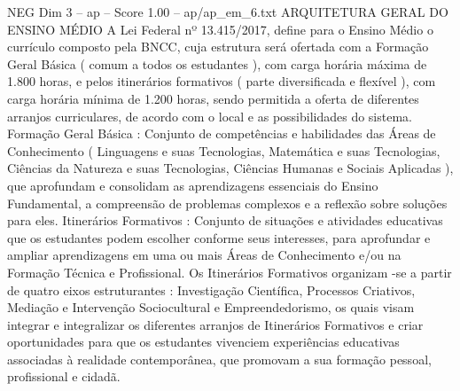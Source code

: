 \begin{textsample}{NEG Dim 3 – ap – Score 1.00 – ap/ap\_em\_6.txt}  \label{ex:f3_neg_109}
ARQUITETURA GERAL DO ENSINO MÉDIO A Lei Federal nº 13.415/2017, define para o Ensino Médio o currículo composto pela BNCC, cuja estrutura será ofertada com a Formação Geral Básica ( comum a todos os estudantes ), com carga horária máxima de 1.800 horas, e pelos itinerários formativos ( parte diversificada e flexível ), com carga horária mínima de 1.200 horas, sendo permitida a oferta de diferentes arranjos curriculares, de acordo com o local e as possibilidades do sistema.
Formação Geral Básica : Conjunto de competências e habilidades das Áreas de Conhecimento ( Linguagens e suas Tecnologias, Matemática e suas Tecnologias, Ciências da Natureza e suas Tecnologias, Ciências Humanas e Sociais Aplicadas ), que aprofundam e consolidam as aprendizagens essenciais do Ensino Fundamental, a compreensão de problemas complexos e a reflexão sobre soluções para eles.
Itinerários Formativos : Conjunto de situações e atividades educativas que os estudantes podem escolher conforme seus interesses, para aprofundar e ampliar aprendizagens em uma ou mais Áreas de Conhecimento e/ou na Formação Técnica e Profissional.
Os Itinerários Formativos organizam -se a partir de quatro eixos estruturantes : Investigação Científica, Processos Criativos, Mediação e Intervenção Sociocultural e Empreendedorismo, os quais visam integrar e integralizar os diferentes arranjos de Itinerários Formativos e criar oportunidades para que os estudantes vivenciem experiências educativas associadas à realidade contemporânea, que promovam a sua formação pessoal, profissional e cidadã.

\end{textsample}
